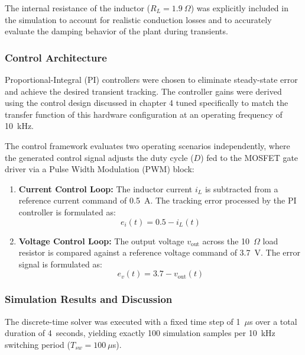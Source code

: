 The internal resistance of the inductor ($R_L = 1.9~\Omega$) was explicitly included in the simulation to account for realistic conduction losses and to accurately evaluate the damping behavior of the plant during transients.

\subsubsection{Control Architecture}
Proportional-Integral (PI) controllers were chosen to eliminate steady-state error and achieve the desired transient tracking. The controller gains were derived using the control design discussed in chapter 4 tuned specifically to match the transfer function of this hardware configuration at an operating frequency of 10~kHz. 

The control framework evaluates two operating scenarios independently, where the generated control signal adjusts the duty cycle ($D$) fed to the MOSFET gate driver via a Pulse Width Modulation (PWM) block:

\begin{enumerate}
    \item \textbf{Current Control Loop:} The inductor current $i_L$ is subtracted from a reference current command of 0.5~A. The tracking error processed by the PI controller is formulated as:
    \begin{equation}
    e_i(t) = 0.5 - i_L(t)
    \end{equation}
    
    \item \textbf{Voltage Control Loop:} The output voltage $v_{\text{out}}$ across the 10~$\Omega$ load resistor is compared against a reference voltage command of 3.7~V. The error signal is formulated as:
    \begin{equation}
    e_v(t) = 3.7 - v_{\text{out}}(t)
    \end{equation}
\end{enumerate}

\subsubsection{Simulation Results and Discussion}
The discrete-time solver was executed with a fixed time step of 1~$\mu$s over a total duration of 4~seconds, yielding exactly 100 simulation samples per 10~kHz switching period ($T_{sw} = 100\ \mu$s).
\newpage
